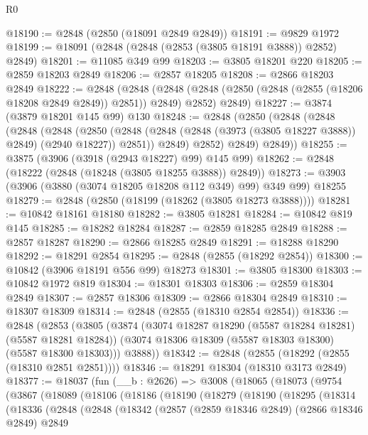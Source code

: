 \begin{lexlean}{R0}
\begin{coremodule}
@18190 := @2848 (@2850 (@18091 @2849 @2849))
@18191 := @9829 @1972
@18199 := @18091 (@2848 (@2848 (@2853 (@3805 @18191 @3888)) @2852) @2849)
@18201 := @11085 @349 @99
@18203 := @3805 @18201 @220
@18205 := @2859 @18203 @2849
@18206 := @2857 @18205
@18208 := @2866 @18203 @2849
@18222 := @2848
    (@2848
      (@2848 (@2848 (@2850 (@2848 (@2855 (@18206 @18208 @2849 @2849)) @2851)) @2849) @2852)
      @2849)
@18227 := @3874 (@3879 @18201 @145 @99) @130
@18248 := @2848
    (@2850
      (@2848
        (@2848
          (@2848
            (@2848
              (@2850
                (@2848 (@2848 (@2848 (@3973 (@3805 @18227 @3888)) @2849) (@2940 @18227)) @2851))
              @2849)
            @2852)
          @2849)
        @2849))
@18255 := @3875 (@3906 (@3918 (@2943 @18227) @99) @145 @99)
@18262 := @2848 (@18222 (@2848 (@18248 (@3805 @18255 @3888)) @2849))
@18273 := @3903 (@3906 (@3880 (@3074 @18205 @18208 @112 @349) @99) @349 @99) @18255
@18279 := @2848 (@2850 (@18199 (@18262 (@3805 @18273 @3888))))
@18281 := @10842 @18161 @18180
@18282 := @3805 @18281
@18284 := @10842 @819 @145
@18285 := @18282 @18284
@18287 := @2859 @18285 @2849
@18288 := @2857 @18287
@18290 := @2866 @18285 @2849
@18291 := @18288 @18290
@18292 := @18291 @2854
@18295 := @2848 (@2855 (@18292 @2854))
@18300 := @10842 (@3906 @18191 @556 @99) @18273
@18301 := @3805 @18300
@18303 := @10842 @1972 @819
@18304 := @18301 @18303
@18306 := @2859 @18304 @2849
@18307 := @2857 @18306
@18309 := @2866 @18304 @2849
@18310 := @18307 @18309
@18314 := @2848 (@2855 (@18310 @2854 @2854))
@18336 := @2848
    (@2853
      (@3805
        (@3874
          (@3074 @18287 @18290 (@5587 @18284 @18281) (@5587 @18281 @18284))
          (@3074 @18306 @18309 (@5587 @18303 @18300) (@5587 @18300 @18303)))
        @3888))
@18342 := @2848 (@2855 (@18292 (@2855 (@18310 @2851 @2851))))
@18346 := @18291 @18304 (@18310 @3173 @2849)
@18377 := @18037
    (fun (__b : @2626) =>
    @3008
      (@18065
        (@18073
          (@9754
            (@3867
              (@18089
                (@18106
                  (@18186
                    (@18190
                      (@18279
                        (@18190
                          (@18295
                            (@18314
                              (@18336
                                (@2848
                                  (@2848
                                    (@18342
                                      (@2857
                                        (@2859 @18346 @2849)
                                        (@2866 @18346 @2849)
                                        @2849

\end{coremodule}
\end{lexlean}
